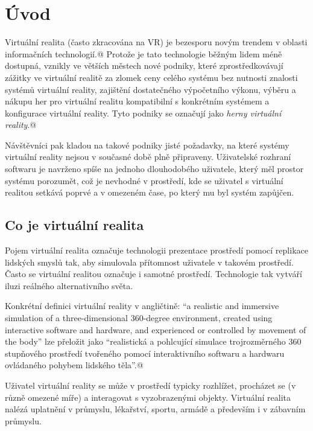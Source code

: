 \section{Úvod}\label{uxfavod}

Virtuální realita (často zkracována na VR) je bezesporu novým trendem v
oblasti informačních technologií.@ Protože je tato technologie běžným
lidem méně dostupná, vznikly ve větších městech nové podniky, které
zprostředkovávají zážitky ve virtuální realitě za zlomek ceny celého
systému bez nutnosti znalosti systémů virtuální reality, zajištění
dostatečného výpočetního výkonu, výběru a nákupu her pro virtuální
realitu kompatibilní s konkrétním systémem a konfigurace virtuální
reality. Tyto podniky se označují jako \emph{herny virtuální reality}.@

Návštěvníci pak kladou na takové podniky jisté požadavky, na které
systémy virtuální reality nejsou v současné době plně připraveny.
Uživatelské rozhraní softwaru je navrženo spíše na jednoho dlouhodobého
uživatele, který měl prostor systému porozumět, což je nevhodné v
prostředí, kde se uživatel s virtuální realitou setkává poprvé a v
omezeném čase, po který mu byl systém zapůjčen.

\subsection{Co je virtuální
realita}\label{co-je-virtuuxe1lnuxed-realita}

Pojem virtuální realita označuje technologii prezentace prostředí pomocí
replikace lidských smyslů tak, aby simulovala přítomnost uživatele v
takovém prostředí. Často se virtuální realitou označuje i samotné
prostředí. Technologie tak vytváří iluzi reálného alternativního světa.

Konkrétní definici virtuální reality v angličtině: ``a realistic and
immersive simulation of a three-dimensional 360-degree environment,
created using interactive software and hardware, and experienced or
controlled by movement of the body'' lze přeložit jako ``realistická a
pohlcující simulace trojrozměrného 360 stupňového prostředí tvořeného
pomocí interaktivního softwaru a hardwaru ovládaného pohybem lidského
těla''.@

Uživatel virtuální reality se může v prostředí typicky rozhlížet,
procházet se (v různě omezené míře) a interagovat s vyzobrazenými
objekty. Virtuální realita nalézá uplatnění v průmyslu, lékařství,
sportu, armádě a především i v zábavním průmyslu.

